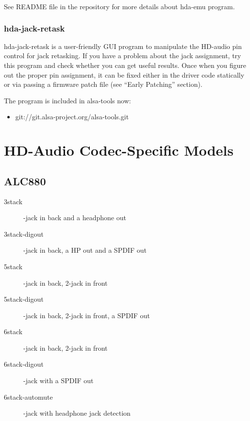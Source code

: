 \documentclass[a4paper,8pt,english]{sphinxmanual}
\begin{document}
See README file in the repository for more details about hda-emu
program.


\subsubsection{hda-jack-retask}
\label{sound/hd-audio/notes:hda-jack-retask}
hda-jack-retask is a user-friendly GUI program to manipulate the
HD-audio pin control for jack retasking.  If you have a problem about
the jack assignment, try this program and check whether you can get
useful results.  Once when you figure out the proper pin assignment,
it can be fixed either in the driver code statically or via passing a
firmware patch file (see ``Early Patching'' section).

The program is included in alsa-tools now:
\begin{itemize}
\item {} 
git://git.alsa-project.org/alsa-tools.git

\end{itemize}


\section{HD-Audio Codec-Specific Models}
\label{sound/hd-audio/models:hd-audio-codec-specific-models}\label{sound/hd-audio/models::doc}

\subsection{ALC880}
\label{sound/hd-audio/models:alc880}\begin{description}
\item[{3stack}] -jack in back and a headphone out

\item[{3stack-digout}] -jack in back, a HP out and a SPDIF out

\item[{5stack}] -jack in back, 2-jack in front

\item[{5stack-digout}] -jack in back, 2-jack in front, a SPDIF out

\item[{6stack}] -jack in back, 2-jack in front

\item[{6stack-digout}] -jack with a SPDIF out

\item[{6stack-automute}] -jack with headphone jack detection

\end{description}
\end{document}

